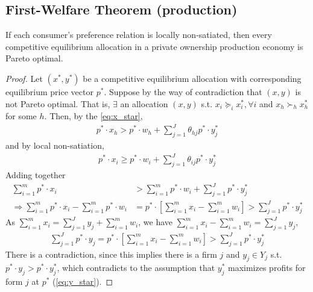 \documentclass[11pt]{elegantbook}
\begin{document}
\subsection{First-Welfare Theorem (production)}
\begin{theorem}
    If each consumer's preference relation is locally non-satiated, then every competitive equilibrium allocation in a private ownership production economy is Pareto optimal.
\end{theorem}
\begin{proof}
    Let $(x^*,y^*)$ be a competitive equilibrium allocation with corresponding equilibrium price vector $p^*$. Suppose by the way of contradiction that $(x,y)$ is not Pareto optimal. That is, $\exists$ an allocation $(x,y)$ s.t. $x_i\succeq_i x_i^*, \forall i$ and $x_h\succ_h x_h^*$ for some $h$. Then, by the \eqref{eq:x_star},
    \begin{equation}
        \begin{aligned}
            p^*\cdot x_h>p^*\cdot w_h+\sum_{j=1}^J\theta_{hj}p^*\cdot y_j^*
        \end{aligned}
        \nonumber
    \end{equation}
    and by local non-satiation,
    \begin{equation}
        \begin{aligned}
            p^*\cdot x_i\geq p^*\cdot w_i+\sum_{j=1}^J\theta_{ij}p^*\cdot y_j^*
        \end{aligned}
        \nonumber
    \end{equation}
    Adding together
    \begin{equation}
        \begin{aligned}
            \sum_{i=1}^m p^*\cdot x_i&>\sum_{i=1}^mp^*\cdot w_i+\sum_{j=1}^Jp^*\cdot y^*_j\\
            \Rightarrow \sum_{i=1}^m p^*\cdot x_i-\sum_{i=1}^mp^*\cdot w_i&=p^*\cdot\left[\sum_{i=1}^mx_i-\sum_{i=1}^mw_i\right]>\sum_{j=1}^Jp^*\cdot y^*_j
        \end{aligned}
        \nonumber
    \end{equation}
    As $\sum_{i=1}^m x_i=\sum_{j=1}^J y_j+\sum_{i=1}^m w_i$, we have $\sum_{i=1}^m x_i-\sum_{i=1}^m w_i=\sum_{j=1}^J y_j$,
    \begin{equation}
        \begin{aligned}
            \sum_{j=1}^Jp^*\cdot y_j=p^*\cdot\left[\sum_{i=1}^mx_i-\sum_{i=1}^mw_i\right]>\sum_{j=1}^Jp^*\cdot y^*_j
        \end{aligned}
        \nonumber
    \end{equation}
    There is a contradiction, since this implies there is a firm $j$ and $y_j\in Y_j$ s.t. $p^*\cdot y_j>p^*\cdot y^*_j$, which contradicts to the assumption that $y_j^*$ maximizes profits for form $j$ at $p^*$ (\eqref{eq:y_star}).
\end{proof}
\end{document}
